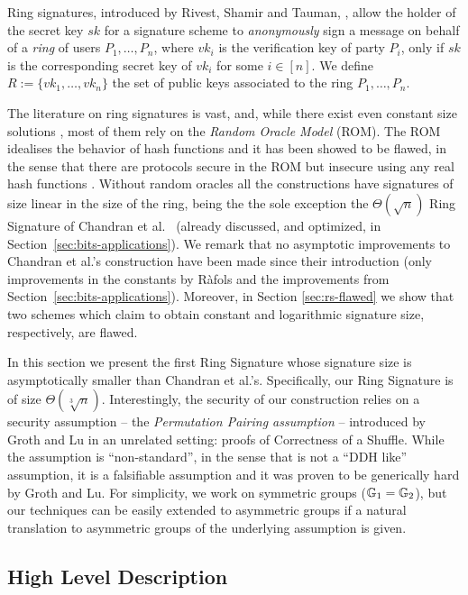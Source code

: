 Ring signatures, introduced by Rivest, Shamir and Tauman, \cite{AC:RivShaTau01}, allow the holder of the secret key $sk$ for a signature scheme to \emph{anonymously} sign a message on behalf of a \emph{ring} of users $P_1,\ldots,P_n$, where $vk_i$ is the verification key of party $P_i$, only if $sk$ is the corresponding secret key of $vk_i$ for some $i\in[n]$. We define $R:=\{vk_1,\ldots,vk_n\}$ the set of public keys associated to the ring $P_1,\ldots,P_n$.

The literature on ring signatures is vast, and, while there exist even constant size solutions \cite{EC:DKNS04}, most of them rely on the \emph{Random Oracle Model} (ROM). The ROM idealises the behavior of hash functions and it has been showed to be flawed, in the sense that there are protocols secure in the ROM but insecure using any real hash functions \cite{STOC:CanGolHal98}. Without random oracles all the constructions have signatures of size linear in the size of the ring, being the the sole exception the $\Theta(\sqrt{n})$ Ring Signature of Chandran et al.~\cite{ICALP:ChaGroSah07} (already discussed, and optimized, in Section~\ref{sec:bits-applications}). We remark that no asymptotic improvements to Chandran et al.'s construction have been made since their introduction (only improvements in the constants by R\`afols \cite{TCC:Rafols15} and the improvements from Section~\ref{sec:bits-applications}). Moreover, in Section \ref{sec:rs-flawed} we show that two schemes which claim to obtain constant and logarithmic signature size, respectively, are flawed.


In this section we present the first Ring Signature whose signature size is asymptotically smaller than Chandran et al.'s. Specifically, our Ring Signature is of size $\Theta(\sqrt[3]{n})$. Interestingly, the security of our construction relies on a security assumption -- the \emph{Permutation Pairing assumption} -- introduced by Groth and Lu \cite{AC:GroLu07} in an unrelated setting: proofs of Correctness of a Shuffle. While the assumption is ``non-standard'', in the sense that is not a ``DDH like'' assumption, it is a falsifiable assumption and it was proven to be generically hard by Groth and Lu. For simplicity, we work on symmetric groups ($\mathbb{G}_1=\mathbb{G}_2$), but our techniques can be easily extended to asymmetric groups if a natural translation to asymmetric groups of the underlying assumption is given.

\subsection{High Level Description}

